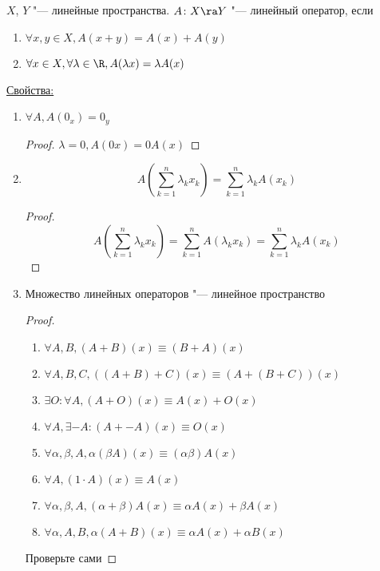 \begin{Def}
	$X$, $Y$ "--- линейные пространства.
	$A\colon X \ra Y$ "--- линейный оператор, если
	\begin{enumerate}
		\item $\forall x, y \in X, A(x + y) = A(x) + A(y)$
		\item $\forall x \in X, \forall \lambda \in \R, A(\lambda x) = \lambda A(x)$
	\end{enumerate}
\end{Def}

\underline{Свойства:}
\begin{enumerate}
\item
	$\forall A, A(0_x) = 0_y$
	\begin{proof}
		$\lambda = 0, A(0x) = 0A(x)$
	\end{proof}

\item
	\[ A\left(\sum_{k = 1}^n \lambda_k x_k\right) = \sum_{k = 1}^n \lambda_k A\left(x_k\right) \]
	\begin{proof}
		\[ A\left(\sum_{k = 1}^n \lambda_k x_k\right) = \sum_{k = 1}^n A\left(\lambda_k x_k\right) = \sum_{k = 1}^n \lambda_k A\left(x_k\right) \]
	\end{proof}

\item
	Множество линейных операторов "--- линейное пространство
	\begin{proof}
		\begin{enumerate}
			\item $\forall A, B, (A + B)(x) \equiv (B + A)(x)$
			\item $\forall A, B, C, ((A + B) + C)(x) \equiv (A + (B + C))(x)$
			\item $\exists O \colon \forall A, (A + O)(x) \equiv A(x) + O(x)$
			\item $\forall A, \exists -A \colon (A + -A)(x) \equiv O(x)$
			\item $\forall \alpha, \beta, A, \alpha(\beta A)(x) \equiv (\alpha \beta)A(x)$
			\item $\forall A, (1 \cdot A)(x) \equiv A(x)$
			\item $\forall \alpha, \beta, A, (\alpha + \beta)A(x) \equiv \alpha A(x) + \beta A(x)$
			\item $\forall \alpha, A, B, \alpha(A + B)(x) \equiv \alpha A(x) + \alpha B(x)$
		\end{enumerate}
	Проверьте сами
\end{proof}
\end{enumerate}

